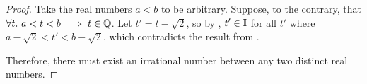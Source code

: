 \begin{proof}
    Take the real numbers $a < b$ to be arbitrary. Suppose, to the contrary, that $\forall t.\ a < t < b \implies t \in \mathbb{Q}$. 
    Let $t' = t - \sqrt{2}$, so by , $t' \in \mathbb{I}$ for all $t'$ where 
    $a - \sqrt{2} < t' < b - \sqrt{2}$, which contradicts the result from .

    Therefore, there must exist an irrational number between any two distinct real numbers.

\end{proof}
